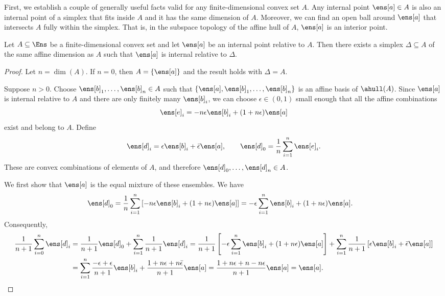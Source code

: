 First, we establish a couple of generally useful facts valid for any finite-dimensional convex set $A$. Any internal point $\ens[a] \in A$ is also an internal point of a simplex that fits inside $A$ and it has the same dimension of $A$. Moreover, we can find an open ball around $\ens[a]$ that intersects $A$ fully within the simplex. That is, in the subspace topology of the affine hull of $A$, $\ens[a]$ is an interior point.

\begin{mathSection}
\begin{prop}\label{pm-es-internalPointSimplex}
	Let $A \subseteq \Ens$ be a finite-dimensional convex set and let $\ens[a]$ be an internal point relative to $A$. Then there exists a simplex $\Delta \subseteq A$ of the same affine dimension as $A$ such that $\ens[a]$ is internal relative to $\Delta$.
\end{prop}

\begin{proof}
	Let $n = \dim(A)$. If $n=0$, then $A = \{\ens[a]\}$ and the result holds with $\Delta=A$.
	
	Suppose $n>0$. Choose $\ens[b]_1, \dots, \ens[b]_n \in A$ such that $\{\ens[a], \ens[b]_1, \dots, \ens[b]_n\}$ is an affine basis of $\ahull(A)$. Since $\ens[a]$ is internal relative to $A$ and there are only finitely many $\ens[b]_i$, we can choose $\epsilon \in (0,1)$ small enough that all the affine combinations
	\begin{equation}
		\ens[e]_i = -n\epsilon\ens[b]_i + (1+n\epsilon)\ens[a]
	\end{equation}
	exist and belong to $A$. Define
	\begin{equation}
		\ens[d]_i = \epsilon\ens[b]_i + \bar{\epsilon}\ens[a],
		\qquad
		\ens[d]_0 = \frac{1}{n}\sum_{i=1}^n \ens[e]_i.
	\end{equation}
	These are convex combinations of elements of $A$, and therefore $\ens[d]_0, \dots, \ens[d]_n \in A$.
	
	We first show that $\ens[a]$ is the equal mixture of these ensembles. We have
	\begin{equation}
		\begin{aligned}
			\ens[d]_0
			&= \frac{1}{n}\sum_{i=1}^n
			\left[-n\epsilon\ens[b]_i + (1+n\epsilon)\ens[a]\right] = -\epsilon\sum_{i=1}^n \ens[b]_i + (1+n\epsilon)\ens[a].
		\end{aligned}
	\end{equation}
	Consequently,
	\begin{equation}
		\begin{aligned}
			\frac{1}{n+1}\sum_{i=0}^n \ens[d]_i
			&= \frac{1}{n+1}\ens[d]_0
			+ \sum_{i=1}^n \frac{1}{n+1}\ens[d]_i = \frac{1}{n+1}
			\left[-\epsilon\sum_{i=1}^n \ens[b]_i + (1+n\epsilon)\ens[a]\right]
			+ \sum_{i=1}^n \frac{1}{n+1}
			\left[\epsilon\ens[b]_i + \bar{\epsilon}\ens[a]\right] \\
			&= \sum_{i=1}^n \frac{-\epsilon+\epsilon}{n+1}\ens[b]_i
			+ \frac{1+n\epsilon+n\bar{\epsilon}}{n+1}\ens[a] = \frac{1+n\epsilon+n-n\epsilon}{n+1}\ens[a] = \ens[a].
		\end{aligned}
	\end{equation}
	

\end{proof}
\end{mathSection}
